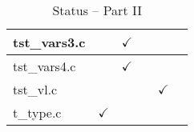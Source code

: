\begin{table}[H]
\begin{tabular}{|l|c|c|c|c|c|}
tst\_vars3.c            &               & $\checkmark$  &               &               &               \\ \hline
tst\_vars4.c            &               & $\checkmark$  &               &               &               \\ \hline
tst\_vl.c               &               &               &               & $\checkmark$  &               \\ \hline
t\_type.c               & $\checkmark$  &               &               &               &               \\ \hline
\hline
\end{tabular}
\caption{Status -- Part II}
\end{table}
